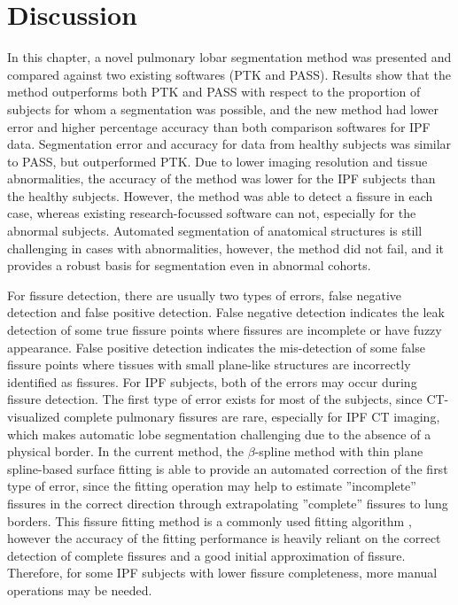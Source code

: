 {\section{Discussion} \label{SegmentationDiscussion}
In this chapter, a novel pulmonary lobar segmentation method was presented and compared against two existing softwares (PTK and PASS). Results show that the method outperforms both PTK and PASS with respect to the proportion of subjects for whom a segmentation was possible, and the new method had lower error and higher percentage accuracy than both comparison softwares for IPF data. Segmentation error and accuracy for data from healthy subjects was similar to PASS, but outperformed PTK. Due to lower imaging resolution and tissue abnormalities, the accuracy of the method was lower for the IPF subjects than the healthy subjects. However, the method was able to detect a fissure in each case, whereas existing research-focussed software can not, especially for the abnormal subjects. Automated segmentation of anatomical structures is still challenging in cases with abnormalities, however, the method did not fail, and it provides a robust basis for segmentation even in abnormal cohorts. 

For fissure detection, there are usually two types of errors, false negative detection and false positive detection. False negative detection indicates the leak detection of some true fissure points where fissures are incomplete or have fuzzy appearance. False positive detection indicates the mis-detection of some false fissure points where tissues with small plane-like structures are incorrectly identified as fissures. For IPF subjects, both of the errors may occur during fissure detection. The first type of error exists for most of the subjects, since CT-visualized complete pulmonary fissures are rare, especially for IPF CT imaging, which makes automatic lobe segmentation challenging due to the absence of a physical border. In the current method, the $\beta$-spline method with thin plane spline-based surface fitting is able to provide an automated correction of the first type of error, since the fitting operation may help to estimate ''incomplete'' fissures in the correct direction through extrapolating ''complete'' fissures to lung borders. This fissure fitting method  is a commonly used fitting algorithm \citep{lee1997scattered,doel2012pulmonary}, however the accuracy of the fitting performance is heavily reliant on the correct detection of complete fissures and a good initial approximation of fissure. Therefore, for some IPF subjects with lower fissure completeness, more manual operations may be needed.

}
